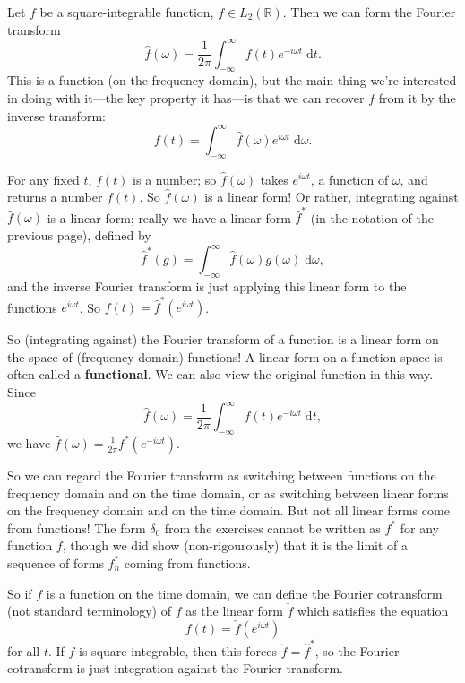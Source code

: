 \documentclass{article}
\newcommand{\diff}{\;\mathrm{d}}
\begin{document}
Let $f$ be a square-integrable function, $f\in L_2(\mathbb{R})$. Then we can form the Fourier transform
\[\hat{f}(\omega)=\frac{1}{2\pi}\int_{-\infty}^\infty f(t)e^{-i\omega t}\diff t.\]
This is a function (on the frequency domain), but the main thing we're interested in doing with it---the key property it has---is that we can recover $f$ from it by the inverse transform:
\[f(t)=\int_{-\infty}^\infty \hat{f}(\omega)e^{i\omega t}\diff \omega.\]

For any fixed $t$, $f(t)$ is a number; so $\hat{f}(\omega)$ takes $e^{i\omega t}$, a function of $\omega$, and returns a number $f(t)$. So $\hat{f}(\omega)$ is a linear form! Or rather, integrating against $\hat{f}(\omega)$ is a linear form; really we have a linear form $\hat{f}^*$ (in the notation of the previous page), defined by
\[\hat{f}^*(g)=\int_{-\infty}^\infty \hat{f}(\omega)g(\omega)\diff \omega,\]
and the inverse Fourier transform is just applying this linear form to the functions $e^{i\omega t}$. So $f(t)=\hat{f}^*\left(e^{i\omega t}\right)$.

So (integrating against) the Fourier transform of a function is a linear form on the space of (frequency-domain) functions! A linear form on a function space is often called a \textbf{functional}. We can also view the original function in this way. Since
\[\hat{f}(\omega)=\frac{1}{2\pi}\int_{-\infty}^\infty f(t)e^{-i\omega t}\diff t,\]
we have $\hat{f}(\omega)=\frac{1}{2\pi}f^*\left(e^{-i\omega t}\right)$.

So we can regard the Fourier transform as switching between functions on the frequency domain and on the time domain, or as switching between linear forms on the frequency domain and on the time domain. But not all linear forms come from functions! The form $\delta_0$ from the exercises cannot be written as $f^*$ for any function $f$, though we did show (non-rigourously) that it is the limit of a sequence of forms $f_n^*$ coming from functions.

So if $f$ is a function on the time domain, we can define the Fourier cotransform (not standard terminology) of $f$ as the linear form $\check{f}$ which satisfies the equation
\[f(t)=\check{f}\left(e^{i\omega t}\right)\]
for all $t$. If $f$ is square-integrable, then this forces $\check{f}=\hat{f}^*$, so the Fourier cotransform is just integration against the Fourier transform.





\clearpage
\end{document}
